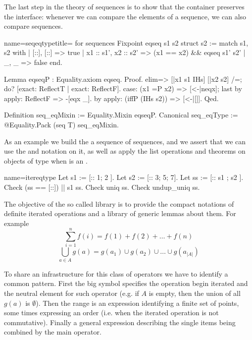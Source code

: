 The last step in the theory of sequences is to show that the container
preserves the  interface: whenever we can compare the
elements of a sequence, we can also compare sequences.

\begin{coq}{name=seqeqtype}{title= for sequences}
Fixpoint eqseq s1 s2 {struct s2} :=
  match s1, s2 with
  | [::], [::] => true
  | x1 :: s1', x2 :: s2' => (x1 == x2) && eqseq s1' s2'
  | _, _ => false
  end.

Lemma eqseqP : Equality.axiom eqseq.
Proof.
elim=> [|x1 s1 IHs] [|x2 s2] /=; do? [exact: ReflectT | exact: ReflectF].
case: (x1 =P x2) => [<-|neqx]; last by apply: ReflectF => -[eqx _].
by apply: (iffP (IHs s2)) => [<-|[]].
Qed.

Definition seq_eqMixin := Equality.Mixin eqseqP.
Canonical seq_eqType := @Equality.Pack (seq T) seq_eqMixin.
\end{coq}

As an example we build the a sequence of sequences, and we assert that
we can use the \C{==} and \C{\\in} notation on it, as well as apply
the list operations and theorems on objects of type 
when  is an .

\begin{coq}{name=itereqtype}{}
Let s1 := [:: 1; 2 ].
Let s2 := [:: 3; 5; 7].
Let ss := [:: s1 ; s2 ].
Check (ss == [::]) || s1 \in ss.
Check uniq ss.
Check undup_uniq ss.
\end{coq}


The objective of the so called  library is to provide
the compact notations of definite iterated operations and a library
of generic lemmas about them.  For example
$$
\sum_{i=1}^n f(i) = f(1) + f(2) + \ldots + f(n)
$$
$$
\bigcup_{a \in A} g(a) = g(a_1) \cup g(a_2) \cup \ldots \cup g(a_{|A|})
$$

To share an infrastructure for this class of operators we have to
identify a common pattern.  First the big symbol specifies the
operation begin iterated and the neutral element for such operator
(e.g. if $A$ is empty, then the union of all $g(a)$ is $\emptyset$).
Then the range is an expression identifying a finite set of points,
some times expressing an order (i.e. when the iterated operation is not
commutative).  Finally a general expression describing the single
items being combined by the main operator.

